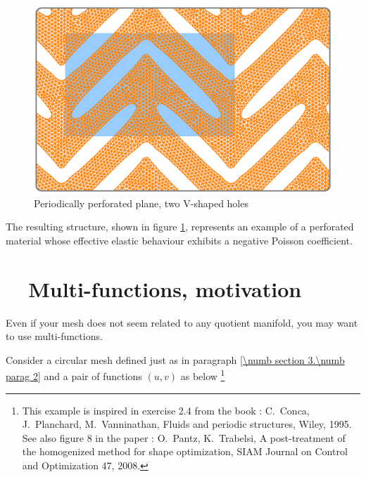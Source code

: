\begin{figure}[ht] \centering
  \includegraphics[width=140mm]{boomerang-3.eps}
  \caption{Periodically perforated plane, two V-shaped holes}
  \label{\numb section 7.\numb fig 21}
\end{figure}

The resulting structure, shown in figure \ref{\numb section 7.\numb fig 21},
represents an example of a perforated material whose effective elastic behaviour
exhibits a negative Poisson coefficient.


\section{~~Multi-functions, motivation}  \label{\numb section 7.\numb parag 24}

Even if your mesh does not seem related to any quotient manifold, you may want to use multi-functions.

Consider a circular mesh defined just as in paragraph \ref{\numb section 3.\numb parag 2}
and a pair of functions $ (u,v) $ as below
\footnote {{} This example is inspired in exercise 2.4 from the book : C.\ Conca, J.\ Planchard,
M.\ Vanninathan, Fluids and periodic structures, Wiley, 1995. See also figure 8 in the paper :
O.\ Pantz, K.\ Trabelsi, A post-treatment of the homogenized method for shape optimization,
SIAM Journal on Control and Optimization 47, 2008.} %

